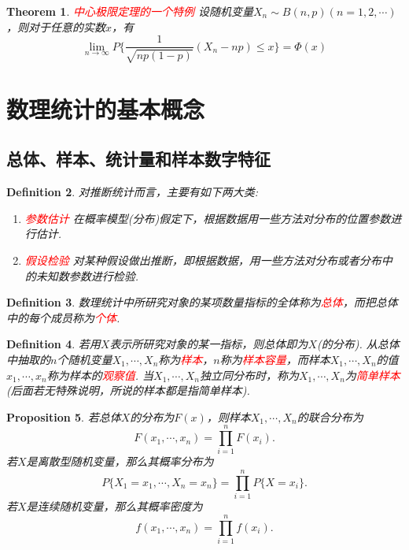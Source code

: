 \documentclass{article}
\newtheorem{theorem}{Theorem}[section]
\newtheorem{proposition}[theorem]{Proposition}
\newtheorem{definition}[theorem]{Definition}
\newcommand{\redt}[1]{\textcolor{red}{#1}}
\begin{document}
\begin{theorem}
\rm \redt{中心极限定理的一个特例} 设随机变量$X_n \sim B(n,p)(n=1,2,\cdots)$，则对于任意的实数$x$，有
$$
\lim\limits_{n \rightarrow \infty}P\{\frac{1}{\sqrt{np(1-p)}}(X_n - np) \leq x\} = \Phi(x)
$$
\end{theorem}


\newpage
\section{数理统计的基本概念}

\subsection{总体、样本、统计量和样本数字特征}

\begin{definition}
\rm 对推断统计而言，主要有如下两大类:
\begin{enumerate}
	\item \redt{参数估计} 在概率模型(分布)假定下，根据数据用一些方法对分布的位置参数进行估计. 
	\item \redt{假设检验} 对某种假设做出推断，即根据数据，用一些方法对分布或者分布中的未知数参数进行检验. 
\end{enumerate}
\end{definition}

\begin{definition}
\rm 数理统计中所研究对象的某项数量指标的全体称为\redt{总体}，而把总体中的每个成员称为\redt{个体}.
\end{definition}

\begin{definition}
\rm 若用$X$表示所研究对象的某一指标，则总体即为$X$(的分布). 从总体中抽取的$n$个随机变量$X_1,\cdots,X_n$称为\redt{样本}，$n$称为\redt{样本容量}，而样本$X_1,\cdots,X_n$的值$x_1,\cdots,x_n$称为样本的\redt{观察值}. 当$X_1,\cdots,X_n$独立同分布时，称为$X_1,\cdots,X_n$为\redt{简单样本}(后面若无特殊说明，所说的样本都是指简单样本).
\end{definition}

\begin{proposition}
\rm 若总体$X$的分布为$F(x)$，则样本$X_1,\cdots,X_n$的联合分布为
$$
F(x_1,\cdots,x_n) = \prod\limits_{i=1}^n F(x_i).
$$
若$X$是离散型随机变量，那么其概率分布为
$$
P\{X_1 = x_1 ,\cdots , X_n = x_n\} = \prod\limits_{i=1}^n P\{X=x_i\}.
$$
若$X$是连续随机变量，那么其概率密度为
$$
f(x_1,\cdots,x_n) = \prod\limits_{i=1}^n f(x_i).
$$
\end{proposition}
\end{document}
